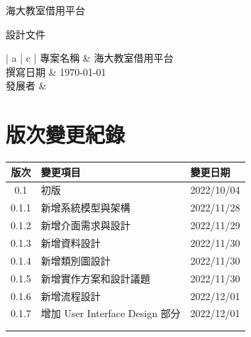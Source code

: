 \documentclass{article}
\begin{document}
\begin{titlepage}
	\centering

	{\huge 海大教室借用平台}

	\vfill

	{\huge 設計文件}

	\vfill

	\begin{Large}
		\begin{center}
			\begin{tabular}{| a | c |}
				\hline
				專案名稱 & 海大教室借用平台               \\ \hline
				撰寫日期 & \today                 \\ \hline
				發展者  &  \\ \hline
			\end{tabular}
		\end{center}
	\end{Large}
\end{titlepage}


\section*{版次變更紀錄}

\begin{tabularx}{\textwidth}{| c | X | X |}
	\rowcolor{LightGray}
	\hline
	版次    & 變更項目                        & 變更日期       \\ \hline
	0.1   & 初版                          & 2022/10/04 \\ \hline
	0.1.1 & 新增系統模型與架構                   & 2022/11/28 \\ \hline
	0.1.2 & 新增介面需求與設計                   & 2022/11/29 \\ \hline
	0.1.3 & 新增資料設計                      & 2022/11/30 \\ \hline
	0.1.4 & 新增類別圖設計                     & 2022/11/30 \\ \hline
	0.1.5 & 新增實作方案和設計議題                 & 2022/11/30 \\ \hline
	0.1.6 & 新增流程設計                      & 2022/12/01 \\ \hline
	0.1.7 & 增加 User Interface Design 部分 & 2022/12/01 \\ \hline
	      &                             &            \\ \hline
	      &                             &            \\ \hline
\end{tabularx}
\end{document}
